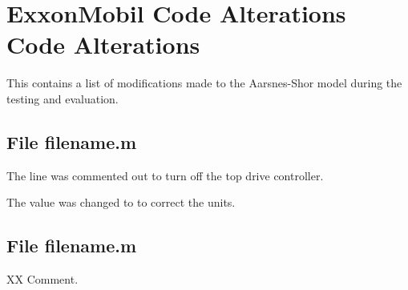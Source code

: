 \chapter{ExxonMobil Code Alterations Code Alterations}
This \appendixname{} contains a list of modifications made to the Aarsnes-Shor model during the testing and evaluation.

\section{File {\codefont filename.m}}
\begin{codemodifications}

\begin{codemodification}{19}
The line was commented out to turn off the top drive controller.
\end{codemodification}

\begin{codemodification}{25}%
The value  was changed to  to correct the units.
\end{codemodification}

\begin{codemodification}{29}
\lipsum[1]
\end{codemodification}

\end{codemodifications}

\section{File {\codefont filename.m}}
\begin{codemodifications}

\begin{codemodification}{XX}
Comment.
\end{codemodification}

\end{codemodifications}